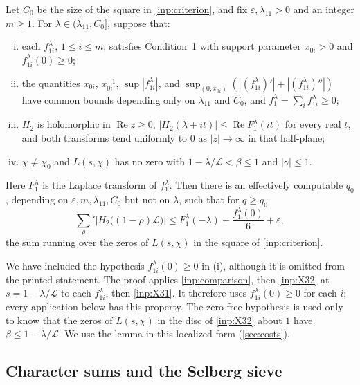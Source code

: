 \documentclass[11pt]{amsart}
\numberwithin{equation}{section}
\theoremstyle{plain}
\theoremstyle{definition}
\theoremstyle{remark}
\newcommand{\LL}{\mathcal{L}}
\renewcommand{\Re}{\operatorname{Re}}
\newcommand{\eps}{\varepsilon}
\newcommand{\1}{\mathbf{1}}
\begin{document}
\begin{inp}\label{inp:envelope}
Let $C_0$ be the size of the square in \cref{inp:criterion}, and fix
$\eps,\lambda_{11}>0$ and an integer $m\ge1$. For $\lambda\in(\lambda_{11},C_0]$, suppose that:
\begin{enumerate}[(i)]
  \item each $f^\lambda_{1i}$, $1\le i\le m$, satisfies Condition~1 with support parameter
    $x_{0i}>0$ and $f^\lambda_{1i}(0)\ge0$;
  \item the quantities $x_{0i}$, $x_{0i}^{-1}$, $\sup|f^\lambda_{1i}|$, and
    $\sup_{(0,x_{0i})}(|(f^\lambda_{1i})'|+|(f^\lambda_{1i})''|)$ have common bounds depending
    only on $\lambda_{11}$ and $C_0$, and $f_1^\lambda=\sum_i f^\lambda_{1i}\ge0$;
  \item $H_2$ is holomorphic in $\Re z\ge0$,
    $|H_2(\lambda+it)|\le\Re F_1^\lambda(it)$ for every real $t$, and both transforms tend
    uniformly to $0$ as $|z|\to\infty$ in that half-plane;
  \item $\chi\ne\chi_0$ and $L(s,\chi)$ has no zero with
    $1-\lambda/\LL<\beta\le1$ and $|\gamma|\le1$.
\end{enumerate}
Here $F_1^\lambda$ is the Laplace transform of $f_1^\lambda$.
Then there is an effectively computable $q_0$,
depending on $\eps,m,\lambda_{11},C_0$ but not on $\lambda$, such that for $q\ge q_0$
\[
  {\sum_\rho}'\bigl|H_2\bigl((1-\rho)\LL\bigr)\bigr|\le F_1^\lambda(-\lambda)+\frac{f_1^\lambda(0)}6+\eps,
\]
the sum running over the zeros of $L(s,\chi)$ in the square of \cref{inp:criterion}.
\end{inp}

We have included the hypothesis $f^\lambda_{1i}(0)\ge0$ in (i), although it is omitted
from the printed statement. The proof \cite[pp.~35--36]{Xylouris2011nullstellen} applies \cref{inp:comparison}, then
\cref{inp:X32} at $s=1-\lambda/\LL$ to each $f^\lambda_{1i}$, then \cref{inp:X31}. It therefore uses
$f^\lambda_{1i}(0)\ge0$ for each $i$; every application below has this property.
The zero-free hypothesis is used only to know
that the zeros of $L(s,\chi)$ in the disc of \cref{inp:X32} about $1$ have $\beta\le1-\lambda/\LL$.
We use the lemma in this localized form (\cref{sec:costs}).

\subsection{Character sums and the Selberg sieve}
\end{document}
